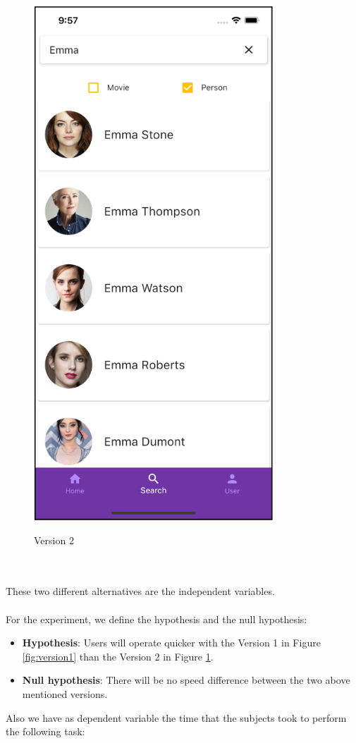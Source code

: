 \documentclass[12pt, a4paper]{article}
\numberwithin{figure}{section}
\begin{document}
\begin{center}
\begin{minipage}{0.3\textwidth}
		\begin{figure}[H]
			\centering
			\includegraphics[width=0.8\textwidth]{images/experiment/searchCheckBox.png}\\
			\caption{Version 2}
			\label{fig:version2}
		\end{figure}
	\end{minipage}
\end{center}
\mbox{}\\\\
\noindent
These two different alternatives are the independent variables.\\\\
For the experiment, we define the hypothesis and the null hypothesis:
\begin{itemize}
	\item \textbf{Hypothesis}: Users will operate quicker with the Version 1 in Figure \ref{fig:version1} than the Version 2 in Figure \ref{fig:version2}. 
	\item \textbf{Null hypothesis}: There will be no speed difference between the two above mentioned versions.
\end{itemize}
Also we have as dependent variable the time that the subjects took to perform the following task:
\end{document}
